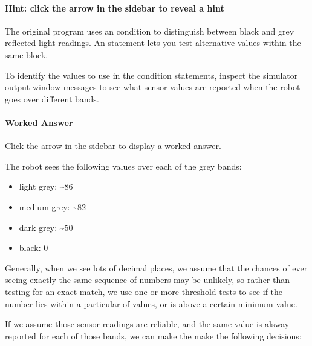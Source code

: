 \documentclass[letterpaper,10pt,english]{sphinxmanual}
\begin{document}
{\paragraph{Hint: click the arrow in the sidebar to reveal a hint}
\label{\detokenize{content/02_Robot_Lab/Section_00_02:Hint:-click-the-arrow-in-the-sidebar-to-reveal-a-hint}}
The original program uses an  condition to distinguish between black and grey reflected light readings. An  statement lets you test alternative values within the same  block.

To identify the values to use in the condition statements, inspect the simulator output window messages to see what sensor values are reported when the robot goes over different bands.


\paragraph{Worked Answer}
\label{\detokenize{content/02_Robot_Lab/Section_00_02:Worked-Answer}}
Click the arrow in the sidebar to display a worked answer.

The robot sees the following values over each of the grey bands:
\begin{itemize}
\item {} 
light grey: \textasciitilde{}86

\item {} 
medium grey: \textasciitilde{}82

\item {} 
dark grey: \textasciitilde{}50

\item {} 
black: 0

\end{itemize}

Generally, when we see lots of decimal places, we assume that the chances of ever seeing exactly the same sequence of numbers may be unlikely, so rather than testing for an exact match, we use one or more threshold tests to see if the number lies within a particular  of values, or is above a certain minimum value.

If we assume those sensor readings are reliable, and the same value is alsway reported for each of those bands, we can make the make the following decisions:

}
\end{document}
